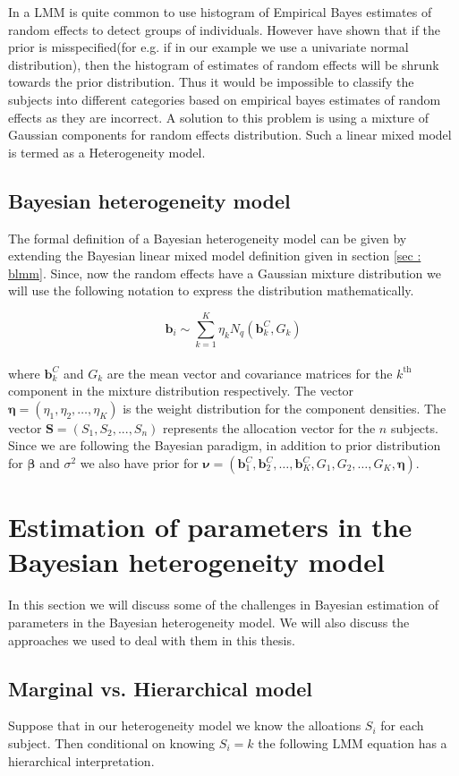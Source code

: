 In a LMM is quite common to use histogram of Empirical Bayes estimates of random effects to detect groups of individuals. However \citet{verbeke_linear_1996} have shown that if the prior is misspecified(for e.g. if in our example we use a univariate normal distribution), then the histogram of estimates of random effects will be shrunk towards the prior distribution. Thus it would be impossible to classify the subjects into different categories based on empirical bayes estimates of random effects as they are incorrect. A solution to this problem is using a mixture of Gaussian components for random effects distribution. Such a linear mixed model is termed as a Heterogeneity model.

\subsection{Bayesian heterogeneity model}
\label{subsec : bhtge}
The formal definition of a Bayesian heterogeneity model can be given by extending the Bayesian linear mixed model definition given in section \ref{sec : blmm}. Since, now the random effects have a Gaussian mixture distribution we will use the following notation to express the distribution mathematically.

$$\boldsymbol{b}_i \sim \sum_{k=1}^{K} \eta_k N_q(\boldsymbol{b}_k^C, G_k)$$\\
where $\boldsymbol{b}_k^C$ and $G_k$ are the mean vector and covariance matrices for the $k^\text{th}$ component in the mixture distribution respectively. The vector $\boldsymbol{\eta} = (\eta_1, \eta_2, \ldots, \eta_K)$ is the weight distribution for the component densities. The vector $\boldsymbol{S}=(S_1, S_2, ..., S_n)$ represents the allocation vector for the $n$ subjects. Since we are following the Bayesian paradigm, in addition to prior distribution for $\boldsymbol{\beta}$ and $\sigma^2$ we also have prior for $\boldsymbol{\nu} = (\boldsymbol{b}_1^C, \boldsymbol{b}_2^C, \ldots, \boldsymbol{b}_K^C, G_1, G_2, \ldots, G_K, \boldsymbol{\eta})$.


\section{Estimation of parameters in the Bayesian heterogeneity model}
In this section we will discuss some of the challenges in Bayesian estimation of parameters in the Bayesian heterogeneity model. We will also discuss the approaches we used to deal with them in this thesis.

\subsection{Marginal vs. Hierarchical model}
Suppose that in our heterogeneity model we know the alloations $S_i$ for each subject. Then conditional on knowing $S_i=k$ the following LMM equation has a hierarchical interpretation.

